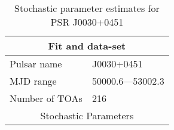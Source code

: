 \documentclass{article}
\begin{document}
\begin{table*}
\caption{Stochastic parameter estimates for PSR J0030+0451}
\begin{tabular}{ll}
\hline\hline
\multicolumn{2}{c}{Fit and data-set} \\ 
\hline
Pulsar name\dotfill & J0030+0451 \\ 
MJD range\dotfill & 50000.6---53002.3 \\ 
Number of TOAs\dotfill & 216 \\
\hline
\multicolumn{2}{c}{Stochastic Parameters} \\ 
\hline
\hline
\end{tabular}
\label{Table:J0030+0451}
\end{table*} 
\end{document}
